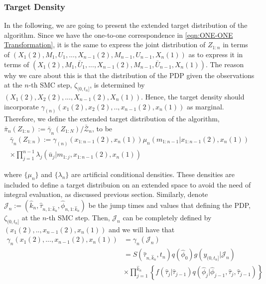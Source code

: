 \documentclass[12pt,a4paper]{article}
\begin{document}
\subsubsection{Target Density}
In the following, we are going to present the extended target distribution of the algorithm. Since we have the one-to-one correspondence in \eqref{eqn:ONE-ONE Transformation}, it is the same to express the joint distribution of $Z_{1:n}$ in terms of 
$\left(X_1(2),M_1,U_1,...,X_{n-1}(2),M_{n-1},U_{n-1},X_n(1)\right)$ as to express it in terms of $\left(X_{1}(2),M_{1},\bar{U}_{1},...,X_{n-1}(2),M_{n-1}, \allowbreak \bar{U}_{n-1},X_n(1)\right)$. The reason why we care about this is that the distribution of the PDP given the observations at the $n$-th SMC step, $\zeta_{(0,t_n]}$, is determined by $\left(X_{1}(2),X_{2}(2),...,X_{n-1}(2),X_n(1)\right)$. Hence, the target density should incorporate \(\gamma_(n)(x_1(2),x_2(2),..,x_{n-1}(2),x_n(1))\) as marginal. Therefore, we define the extended target distribution of the algorithm, $\bar{\pi}_n(Z_{1:n}) := \bar{\gamma}_n(Z_{1:N})/\bar{\mathcal{Z}}_n$, to be 
\begin{multline}
    \label{Block-VRPF Target}
    \bar{\gamma}_n\left(Z_{1:n}\right) := \gamma_(n)(x_{1:n-1}(2),x_n(1))\mu_n\left(m_{1:n-1}|x_{1:n-1}(2),x_n(1)\right)\\
    \times \prod_{j=1}^{n-1} \lambda_j\left(\bar{u}_{j} | m_{1:j},x_{1:n-1}(2),x_n(1)\right) 
\end{multline}

where \(\{\mu_n\}\) and \(\{\lambda_n\}\) are artificial conditional densities. These densities are included to define a target distribuion on an extended space to avoid the need of integral evaluation, as discussed previous section. Similarly, denote $\mathcal{J}_n := \left(\hat{k}_n,\hat{\tau}_{n,1:\hat{k}_n},\hat{\phi}_{n,1:\hat{k}_n}\right)$ be the jump times and values that defining the PDP, $\zeta_{(0,t_n]}$ at the $n$-th SMC step. Then, \(\mathcal{J}_n\) can be completely defined by \((x_1(2),..,x_{n-1}(2),x_n(1))\) and we will have that 
\begin{equation*}
    \begin{split}
        \gamma_n\left(x_{1}(2),...,x_{n-1}(2),x_n(1)\right) &= \gamma_n\left(\mathcal{J}_n\right)\\
        &= S\left(\hat{\tau}_{n,\hat{k}_n},t_n\right)q\left(\hat{\phi}_0\right)g\left(y_{(0,t_n]}|\mathcal{J}_n\right)\\
        & \times \prod_{j=1}^{\hat{k}_n} \left\{f\left(\hat{\tau}_j|\hat{\tau}_{j-1}\right)q\left(\hat{\phi}_{j}|\hat{\phi}_{j-1},\hat{\tau}_{j},\hat{\tau}_{j-1}\right)\right\}
    \end{split}
\end{equation*}
\end{document}

